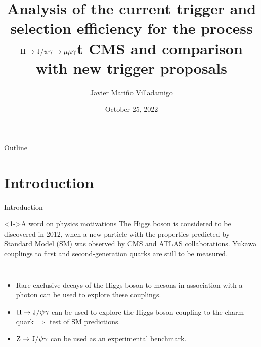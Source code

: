 \documentclass[aspectratio = 1610, xcolor = dvipsnames]{beamer}
\title[]{{\large  Analysis of the current trigger and selection efficiency for the process \texorpdfstring{$\H \rightarrow \JPsi\gamma \rightarrow \mu\mu\gamma$} at CMS and comparison with new trigger proposals}} %
\author{Javier Mariño Villadamigo} %
\institute[unipd] %
{
	\scriptsize{Research Activities} \\ 
	\scriptsize{Academic year: 2021/2022} \\
	\smallskip
	\scriptsize{Università degli studi di Padova} %
}
\date{October 25, 2022} %
\newcommand{\JPsi}{{\rm J}/\psi}
\begin{document}
	
	\begin{frame}
		\titlepage %
	\end{frame}

	
	
	
	
	\begin{frame}[t]{Outline}
        \tableofcontents
	\end{frame}
	
	
    \section{Introduction}
    
    \begin{frame}[t]{Introduction}

        \begin{block}<1->{A word on physics motivations}
            The Higgs boson is considered to be discovered in 2012, when a new particle with the properties predicted by Standard Model (SM) was observed by CMS and ATLAS collaborations. Yukawa couplings to first and second-generation quarks are still to be measured.
        \end{block}

        \begin{columns}[c]

            
            \begin{itemize}
                \item \textcolor{unipd}{Rare exclusive decays} of the Higgs boson to mesons in association with a photon can be used to explore these couplings.
                \item ${\rm H}\rightarrow \JPsi \gamma$ can be used to explore the Higgs boson \textcolor{unipd}{coupling to the charm quark} $\Rightarrow$ \textcolor{unipd}{test of SM predictions}.
                \item ${\rm Z}\rightarrow \JPsi \gamma$ can be used as an \textcolor{unipd}{experimental benchmark}.
            \end{itemize}

        \end{columns}
    \end{frame}
	
\end{document}
